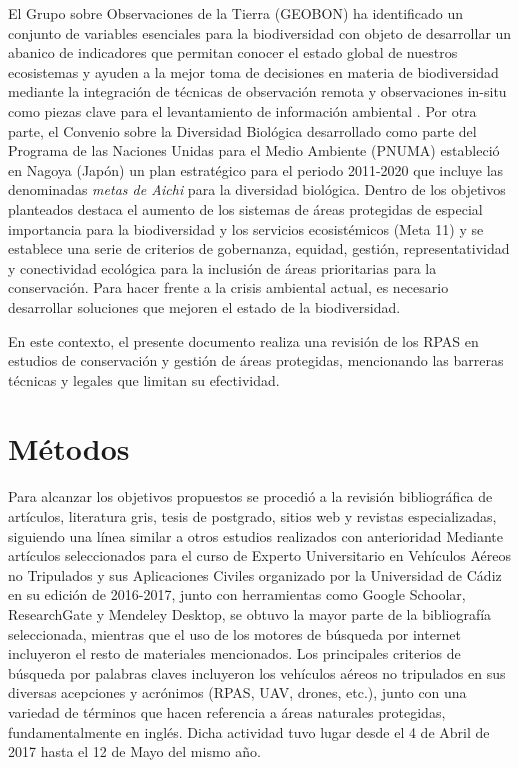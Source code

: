\documentclass[onecolumn]{extarticle}
\begin{document}
El Grupo sobre Observaciones de la Tierra (GEOBON) ha identificado un
conjunto de variables esenciales para la biodiversidad
\citep{Pereira2013} con objeto de desarrollar un abanico de indicadores
que permitan conocer el estado global de nuestros ecosistemas y ayuden a
la mejor toma de decisiones en materia de biodiversidad mediante la
integración de técnicas de observación remota y observaciones in-situ
como piezas clave para el levantamiento de información ambiental
\citep{Forum2008}. Por otra parte, el Convenio sobre la Diversidad
Biológica desarrollado como parte del Programa de las Naciones Unidas
para el Medio Ambiente (PNUMA) estableció en Nagoya (Japón) un plan
estratégico para el periodo 2011-2020 que incluye las denominadas
\emph{metas de Aichi} para la diversidad biológica. Dentro de los
objetivos planteados destaca el aumento de los sistemas de áreas
protegidas de especial importancia para la biodiversidad y los servicios
ecosistémicos (Meta 11) y se establece una serie de criterios de
gobernanza, equidad, gestión, representatividad y conectividad ecológica
para la inclusión de áreas prioritarias para la conservación. Para hacer
frente a la crisis ambiental actual, es necesario desarrollar soluciones
que mejoren el estado de la biodiversidad.

En este contexto, el presente documento realiza una revisión de los RPAS
en estudios de conservación y gestión de áreas protegidas, mencionando
las barreras técnicas y legales que limitan su efectividad.

\section{Métodos}\label{metodos}

Para alcanzar los objetivos propuestos se procedió a la revisión
bibliográfica de artículos, literatura gris, tesis de postgrado, sitios
web y revistas especializadas, siguiendo una línea similar a otros
estudios realizados con anterioridad \citep{Linchant2015, Christie2016}
Mediante artículos seleccionados para el curso de Experto Universitario
en Vehículos Aéreos no Tripulados y sus Aplicaciones Civiles organizado
por la Universidad de Cádiz en su edición de 2016-2017, junto con
herramientas como Google Schoolar, ResearchGate y Mendeley Desktop, se
obtuvo la mayor parte de la bibliografía seleccionada, mientras que el
uso de los motores de búsqueda por internet incluyeron el resto de
materiales mencionados. Los principales criterios de búsqueda por
palabras claves incluyeron los vehículos aéreos no tripulados en sus
diversas acepciones y acrónimos (RPAS, UAV, drones, etc.), junto con una
variedad de términos que hacen referencia a áreas naturales protegidas,
fundamentalmente en inglés. Dicha actividad tuvo lugar desde el 4 de
Abril de 2017 hasta el 12 de Mayo del mismo año.
\end{document}
